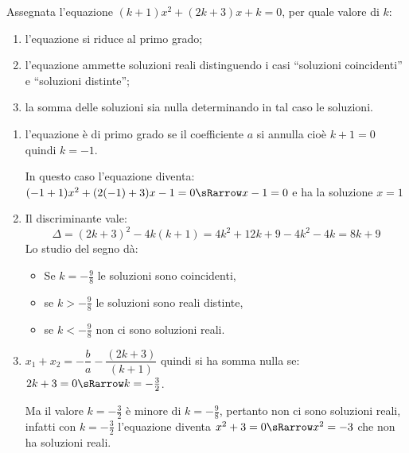 
\begin{esempio}{}{}
Assegnata l'equazione \(( k +1 ) x^2 +( 2 k +3 ) x +k = 0\), per 
quale valore di \(k\):
\begin{enumerate}[nosep, left=0mm]
\item l'equazione si riduce al primo grado;
\item l'equazione ammette soluzioni reali distinguendo i casi ``soluzioni 
coincidenti'' e ``soluzioni distinte'';
\item la somma delle soluzioni sia nulla determinando in tal caso le 
soluzioni.
\end{enumerate}

\medskip
\begin{enumerate}[left=0mm]
\item l'equazione è di primo grado se il coefficiente \(a\) si annulla 
cioè \(k +1 = 0\) quindi \(k = -1\). 

In questo caso l'equazione diventa: 
\((-1 +1 ) x^2 +(2(-1) +3 ) x -1 = 0 \sRarrow x -1 = 0\)
e ha la soluzione \(x = 1\)
\item Il discriminante vale:
\[\Delta = (2k +3)^2 -4 k (k +1) = 4 k^2 +12 k +9 -4 k^2 -4 k = 8 k +9\] 
Lo studio del segno dà:

\vspace{-5mm} \hspace*{-5mm} 
\vspace{-5mm} 
\begin{itemize}
\item Se \(k = -\frac{9}{8}\) le soluzioni sono coincidenti,
\item se \(k > -\frac{9}{8}\) le soluzioni sono reali distinte, 
\item se \(k < -\frac{9}{8}\) non ci sono soluzioni reali.
\end{itemize}

\item \(x_1 +x_2 = -\dfrac{b}{a}-\dfrac{(2k +3 )}{(k +1)}\) 
quindi si ha somma nulla se: \\
\(2 k +3 = 0 \sRarrow k = -\frac{3}{2}\). 

Ma il valore \(k = -\frac{3}{2}\) è minore di \(k = -\frac{9}{8}\), 
pertanto non ci sono soluzioni reali, infatti con 
\(k = -\frac{3}{2}\) l'equazione diventa \(x^2 +3 = 0 \sRarrow x^2 = -3\) 
che non ha soluzioni reali.
\end{enumerate}
\end{esempio}


